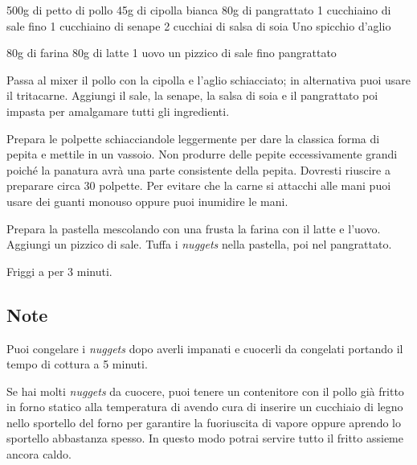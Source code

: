\begin{ingreds}
	500g  di petto di pollo 
	45g di cipolla bianca 
	80g di pangrattato
	1 cucchiaino di sale fino
	1 cucchiaino di senape 
	2 cucchiai di salsa di soia 
	Uno spicchio d'aglio


\columnbreak
{}
	80g di farina 
	80g di latte 
	1 uovo 
	un pizzico di sale fino
	pangrattato 
\end{ingreds}

\begin{method}
Passa al mixer il pollo con la cipolla e l'aglio schiacciato; in alternativa puoi usare il tritacarne. Aggiungi il sale, la senape, la salsa di soia e il pangrattato poi impasta per amalgamare tutti gli ingredienti.

Prepara le polpette schiacciandole leggermente per dare la classica forma di pepita e mettile in un vassoio. Non produrre delle pepite eccessivamente grandi poiché la panatura avrà una parte consistente della pepita. Dovresti riuscire a preparare circa 30 polpette. Per evitare che la carne si attacchi alle mani puoi usare dei guanti monouso oppure puoi inumidire le mani.

Prepara la pastella mescolando con una frusta la farina con il latte e l'uovo. Aggiungi un pizzico di sale. Tuffa i \textit{nuggets} nella pastella, poi nel pangrattato.

Friggi a  per 3 minuti.

\end {method}

\subsection*{Note}
		Puoi congelare i \textit{nuggets} dopo averli impanati e cuocerli da congelati portando il tempo di cottura a 5 minuti.

		Se hai molti \textit{nuggets} da cuocere, puoi tenere un contenitore con il pollo già fritto in forno statico alla temperatura di  avendo cura di inserire un cucchiaio di legno nello sportello del forno per garantire la fuoriuscita di vapore oppure aprendo lo sportello abbastanza spesso. In questo modo potrai servire tutto il fritto assieme ancora caldo.


